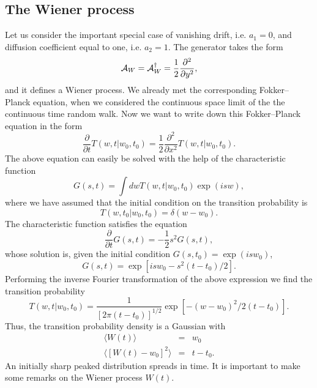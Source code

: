 \subsection{The Wiener process}
Let us consider the important special case 
of vanishing drift, i.e. $a_1=0$, and diffusion coefficient
equal to one, i.e. $a_2=1$. The generator takes the form 
\begin{equation}
\label{WIENER_GENERATOR}
{\cal{A}}_W = {\cal{A}}_W^{\dagger} = \frac{1}{2} 
     \frac{\partial^2}{\partial y^2},
\end{equation}
and it defines a Wiener process. We already met the corresponding
Fokker--Planck equation, 
when we considered the continuous space limit of the the 
continuous time random walk.
Now we want to write down this Fokker--Planck equation in the form
\begin{equation*}
\frac{\partial}{\partial t}T(w,t|w_0,t_0) =
  \frac{1}{2} \frac{\partial^2}{\partial x^2} T(w,t|w_0,t_0).
\end{equation*}
The above equation can easily be solved with the help of the 
characteristic function
\begin{equation*}
G(s,t) = \int dw T(w,t|w_0,t_0) \exp(isw),
\end{equation*}
where we have assumed that the initial condition on the transition 
probability is
\begin{equation*}
T(w,t_0|w_0,t_0) = \delta(w-w_0).
\end{equation*}
The characteristic function satisfies the equation
\begin{equation*}
\frac{\partial}{\partial t}G(s,t) = - \frac{1}{2} s^2 G(s,t),
\end{equation*}
whose solution is, given the initial condition $G(s,t_0)=\exp(isw_0)$, 
\begin{equation*}
G(s,t) = \exp\left[isw_0 -s^2(t-t_0)/2\right].
\end{equation*}
Performing the inverse Fourier transformation of the above 
expression we find the transition probability
\begin{equation}
\label{TRANS_WIENER}
T(w,t|w_0,t_0)= \frac{1}{[2 \pi (t-t_0)]^{1/2}}
     \exp\left[ -(w-w_0)^2/2(t-t_0)\right].
\end{equation}
Thus, the transition probability density is a Gaussian with
\begin{eqnarray*}
\langle W(t) \rangle &=& w_0 \\
\langle [W(t)-w_0]^2\rangle &=& t-t_0.
\end{eqnarray*}
An initially sharp peaked distribution spreads in time.
It is important to make some remarks on the Wiener process $W(t)$.

